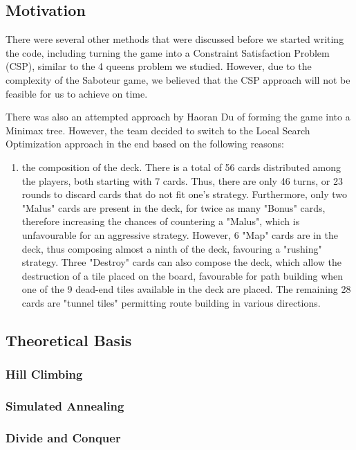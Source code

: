 \documentclass[12pt,twoside,letterpaper]{article}
\begin{document}
\subsection{Motivation}
There were several other methods that were discussed before we started writing the code, including turning the game into a Constraint Satisfaction Problem (CSP), similar to the 4 queens problem we studied. However, due to the complexity of the Saboteur game, we believed that the CSP approach will not be feasible for us to achieve on time.
\par There was also an attempted approach by Haoran Du of forming the game into a Minimax tree. However, the team decided to switch to the Local Search Optimization approach in the end based on the following reasons:
\begin{enumerate}
  \item the composition of the deck. There is a total of 56 cards distributed among the players, both starting with 7 cards. Thus, there are only 46 turns, or 23 rounds to discard cards that do not fit one's strategy. Furthermore, only two "Malus" cards are present in the deck, for twice as many "Bonus" cards, therefore increasing the chances of countering a "Malus", which is unfavourable for an aggressive strategy. However, 6 "Map" cards are in the deck, thus composing almost a ninth of the deck, favouring a "rushing" strategy. Three "Destroy" cards can also compose the deck, which allow the destruction of a tile placed on the board, favourable for path building when one of the 9 dead-end tiles available in the deck are placed. The remaining 28 cards are "tunnel tiles" permitting route building in various directions.

\end{enumerate}
\subsection{Theoretical Basis}
\subsubsection{Hill Climbing}
\subsubsection{Simulated Annealing}
\subsubsection{Divide and Conquer}
\clearpage
\end{document}
